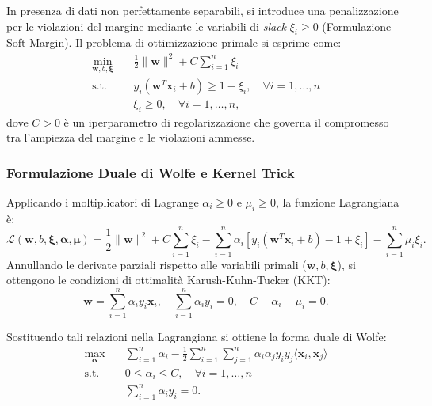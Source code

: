 In presenza di dati non perfettamente separabili, si introduce una penalizzazione per le violazioni del margine mediante le variabili di \textit{slack} $\xi_i \ge 0$ (Formulazione Soft-Margin). Il problema di ottimizzazione primale si esprime come:
\begin{equation}
\begin{aligned}
\min_{\mathbf{w}, b, \boldsymbol{\xi}} \quad & \frac{1}{2} \|\mathbf{w}\|^2 + C \sum_{i=1}^{n} \xi_i \\
\text{s.t.} \quad & y_i (\mathbf{w}^T \mathbf{x}_i + b) \ge 1 - \xi_i, \quad \forall i=1, \dots, n \\
& \xi_i \ge 0, \quad \forall i=1, \dots, n,
\end{aligned}
\end{equation}
dove $C > 0$ è un iperparametro di regolarizzazione che governa il compromesso tra l'ampiezza del margine e le violazioni ammesse.

\subsubsection{Formulazione Duale di Wolfe e Kernel Trick}
Applicando i moltiplicatori di Lagrange $\alpha_i \ge 0$ e $\mu_i \ge 0$, la funzione Lagrangiana è:
\begin{equation}
\mathcal{L}(\mathbf{w}, b, \boldsymbol{\xi}, \boldsymbol{\alpha}, \boldsymbol{\mu}) = \frac{1}{2} \|\mathbf{w}\|^2 + C \sum_{i=1}^n \xi_i - \sum_{i=1}^n \alpha_i \left[ y_i(\mathbf{w}^T \mathbf{x}_i + b) - 1 + \xi_i \right] - \sum_{i=1}^n \mu_i \xi_i.
\end{equation}
Annullando le derivate parziali rispetto alle variabili primali ($\mathbf{w}, b, \boldsymbol{\xi}$), si ottengono le condizioni di ottimalità Karush-Kuhn-Tucker (KKT):
\begin{equation}
\mathbf{w} = \sum_{i=1}^{n} \alpha_i y_i \mathbf{x}_i, \quad \sum_{i=1}^{n} \alpha_i y_i = 0, \quad C - \alpha_i - \mu_i = 0.
\end{equation}

\noindent Sostituendo tali relazioni nella Lagrangiana si ottiene la forma duale di Wolfe:
\begin{equation}
\begin{aligned}
\max_{\boldsymbol{\alpha}} \quad & \sum_{i=1}^{n} \alpha_i - \frac{1}{2} \sum_{i=1}^{n} \sum_{j=1}^{n} \alpha_i \alpha_j y_i y_j \langle \mathbf{x}_i, \mathbf{x}_j \rangle \\
\text{s.t.} \quad & 0 \le \alpha_i \le C, \quad \forall i=1, \dots, n \\
& \sum_{i=1}^{n} \alpha_i y_i = 0.
\end{aligned}
\end{equation}

